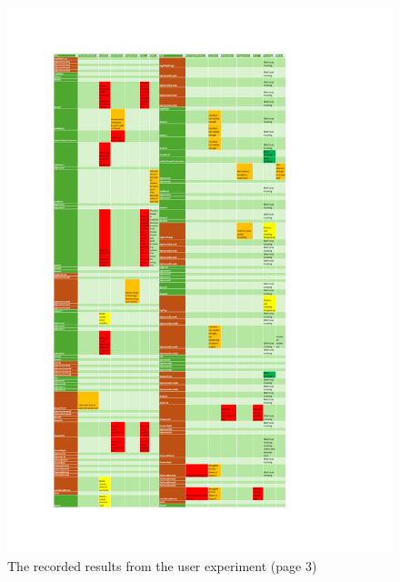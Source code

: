 \documentclass{l4proj}
\begin{document}
\begin{appendices}
\begin{figure}
    \centering
    \includegraphics[width=1\linewidth]{dissertation//images/results3.pdf}
    \caption{The recorded results from the user experiment (page 3)}
\end{figure}


\end{appendices}
\end{document}
